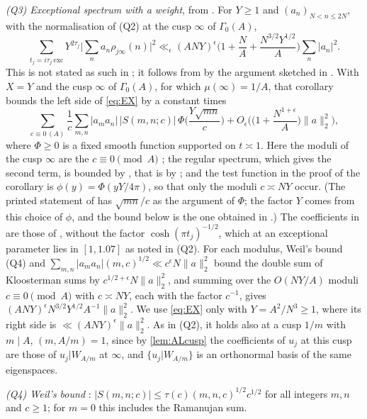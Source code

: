 \documentclass[11pt,colorlinks]{charlie}
\begin{document}
\emph{(Q3) Exceptional spectrum with a weight}, from \cite[Lemma~3.9 and Corollary~3.10]{Pascadi}. For $Y\ge1$ and $(a_n)_{N<n\le2N}$, with the normalisation of (Q2) at the cusp $\infty$ of $\Gamma_0(A)$,
\begin{equation}\label{eq:EX}
 \sum_{t_j=i\tau_j\ \mathrm{exc}}Y^{2\tau_j}\Big|\sum_na_n\rho_{j\infty}(n)\Big|^2\ll_\epsilon(ANY)^\epsilon\Big(1+\frac NA+\frac{N^{3/2}Y^{1/2}}A\Big)\sum_n|a_n|^2 .
\end{equation}
This is not stated as such in \cite{Pascadi}; it follows from \cite[Corollary~3.10]{Pascadi} by the argument sketched in \cite[\S2]{Pascadi}. With $X=Y$ and the cusp $\infty$ of $\Gamma_0(A)$, for which $\mu(\infty)=1/A$, that corollary bounds the left side of \eqref{eq:EX} by a constant times
\[
 \sum_{c\equiv0\,(A)}\frac1c\sum_{m,n}|a_ma_n|\,|S(m,n;c)|\,\Phi\Big(\frac{Y\sqrt{mn}}c\Big)+O_\epsilon\Big(\Big(1+\frac{N^{1+\epsilon}}A\Big)\|a\|_2^2\Big),
\]
where $\Phi\ge0$ is a fixed smooth function supported on $t\asymp1$. Here the moduli of the cusp $\infty$ are the $c\equiv0\pmod A$ \cite[Lemma~3.2]{Pascadi}; the regular spectrum, which gives the second term, is bounded by \cite[Lemma~3.9]{Pascadi}, that is by \cite[Theorem~2]{DI}; and the test function in the proof of the corollary is $\phi(y)=\Phi(yY/4\pi)$, so that only the moduli $c\asymp NY$ occur. (The printed statement of \cite[Corollary~3.10]{Pascadi} has $\sqrt{mn}/c$ as the argument of $\Phi$; the factor $Y$ comes from this choice of $\phi$, and the bound below is the one obtained in \cite[\S2]{Pascadi}.) The coefficients in \cite{Pascadi} are those of \cite{DI}, without the factor $\cosh(\pi t_j)^{-1/2}$, which at an exceptional parameter lies in $[1,1.07]$ as noted in (Q2). For each modulus, Weil's bound (Q4) and $\sum_{m,n}|a_ma_n|(m,c)^{1/2}\ll c^\epsilon N\|a\|_2^2$ bound the double sum of Kloosterman sums by $c^{1/2+\epsilon}N\|a\|_2^2$, and summing over the $O(NY/A)$ moduli $c\equiv0\pmod A$ with $c\asymp NY$, each with the factor $c^{-1}$, gives $(ANY)^\epsilon N^{3/2}Y^{1/2}A^{-1}\|a\|_2^2$. We use \eqref{eq:EX} only with $Y=A^2/N^3\ge1$, where its right side is $\ll(ANY)^\epsilon\|a\|_2^2$. As in (Q2), it holds also at a cusp $1/m$ with $m\mid A$, $(m,A/m)=1$, since by \cref{lem:ALcusp} the coefficients of $u_j$ at this cusp are those of $u_j|W_{A/m}$ at $\infty$, and $\{u_j|W_{A/m}\}$ is an orthonormal basis of the same eigenspaces.

\emph{(Q4) Weil's bound} \cite[Corollary~11.12]{IK}: $|S(m,n;c)|\le\tau(c)(m,n,c)^{1/2}c^{1/2}$ for all integers $m,n$ and $c\ge1$; for $m=0$ this includes the Ramanujan sum.
\end{document}
